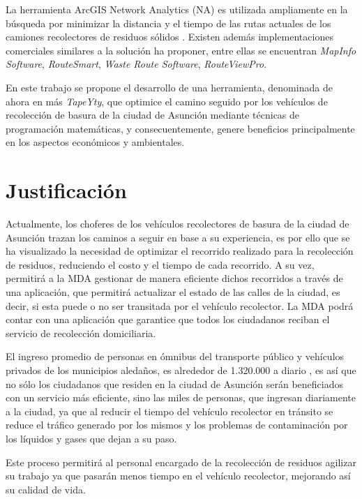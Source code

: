 La herramienta ArcGIS Network Analytics (NA) es utilizada ampliamente en la búsqueda por minimizar la distancia y el tiempo de las rutas actuales de los camiones recolectores de residuos sólidos \citep{Kallel2016UsingTunisia, Malakahmad2014SolidMalaysia}. Existen además implementaciones comerciales similares a la solución ha proponer, entre ellas se encuentran \textit{MapInfo Software}, \textit{RouteSmart}, \textit{Waste Route Software}, \textit{RouteViewPro}.

En este trabajo se propone el desarrollo de una herramienta, denominada de ahora en más \textit{TapeYty}, que optimice el camino seguido por los vehículos de recolección de basura de la ciudad de Asunción mediante técnicas de programación matemáticas, y consecuentemente, genere beneficios principalmente en los aspectos económicos y ambientales.

\section{Justificación}
 Actualmente, los choferes de los vehículos recolectores de basura de la ciudad de Asunción trazan los caminos a seguir en base a su experiencia, es por ello que se ha visualizado la necesidad de optimizar el recorrido realizado para la recolección de residuos, reduciendo el costo y el tiempo de cada recorrido. A su vez, permitirá a la MDA gestionar de manera eficiente dichos recorridos a través de una aplicación, que permitirá actualizar el estado de las calles de la ciudad, es decir, si esta puede o no ser transitada por el vehículo recolector. La MDA podrá contar con una aplicación que garantice que todos los ciudadanos reciban el servicio de recolección domiciliaria.

El ingreso promedio de personas en ómnibus del transporte público y vehículos privados de los municipios aledaños, es alrededor de 1.320.000 a diario \citep{DiarioABCColor2016PorColor}, es así que no sólo los ciudadanos que residen en la ciudad de Asunción serán beneficiados con un servicio más eficiente, sino las miles de personas, que ingresan diariamente a la ciudad, ya que al reducir el tiempo del vehículo recolector en tránsito se reduce el tráfico generado por los mismos y los problemas de contaminación por los líquidos y gases que dejan a su paso.

Este proceso permitirá al personal encargado de la recolección de residuos agilizar su trabajo ya que pasarán menos tiempo en el vehículo recolector, mejorando así su calidad de vida.
 
